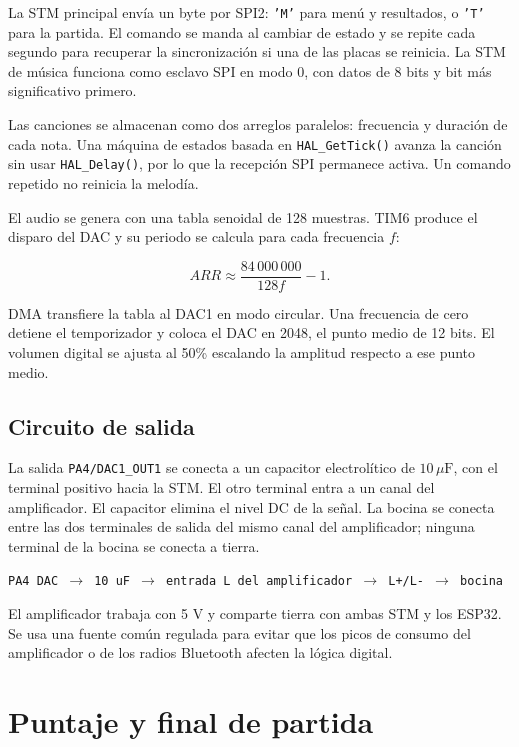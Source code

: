 \documentclass[11pt,letterpaper]{article}
\begin{document}
La STM principal envía un byte por SPI2: \texttt{'M'} para menú y resultados, o
\texttt{'T'} para la partida. El comando se manda al cambiar de estado y se repite
cada segundo para recuperar la sincronización si una de las placas se reinicia. La
STM de música funciona como esclavo SPI en modo 0, con datos de 8 bits y bit más
significativo primero.

Las canciones se almacenan como dos arreglos paralelos: frecuencia y duración de
cada nota. Una máquina de estados basada en \texttt{HAL\_GetTick()} avanza la canción
sin usar \texttt{HAL\_Delay()}, por lo que la recepción SPI permanece activa. Un
comando repetido no reinicia la melodía.

El audio se genera con una tabla senoidal de 128 muestras. TIM6 produce el disparo
del DAC y su periodo se calcula para cada frecuencia $f$:

\begin{equation}
ARR \approx \frac{84\,000\,000}{128f}-1.
\end{equation}

DMA transfiere la tabla al DAC1 en modo circular. Una frecuencia de cero detiene el
temporizador y coloca el DAC en 2048, el punto medio de 12 bits. El volumen digital
se ajusta al 50\% escalando la amplitud respecto a ese punto medio.

\subsection{Circuito de salida}

La salida \texttt{PA4/DAC1\_OUT1} se conecta a un capacitor electrolítico de
$10\,\mu\text{F}$, con el terminal positivo hacia la STM. El otro terminal entra a
un canal del amplificador. El capacitor elimina el nivel DC de la señal. La bocina se
conecta entre las dos terminales de salida del mismo canal del amplificador; ninguna
terminal de la bocina se conecta a tierra.

\begin{center}
\texttt{PA4 DAC $\rightarrow$ 10 uF $\rightarrow$ entrada L del amplificador
$\rightarrow$ L+/L- $\rightarrow$ bocina}
\end{center}

El amplificador trabaja con 5 V y comparte tierra con ambas STM y los ESP32. Se usa
una fuente común regulada para evitar que los picos de consumo del amplificador o de
los radios Bluetooth afecten la lógica digital.

\section{Puntaje y final de partida}
\end{document}
